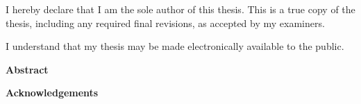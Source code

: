 \noindent
I hereby declare that I am the sole author of this thesis. This is a true copy of the thesis, including any required final revisions, as accepted by my examiners.

\bigskip

\noindent
I understand that my thesis may be made electronically available to the public.

\cleardoublepage


\begin{center}\textbf{Abstract}\end{center}



\cleardoublepage


\begin{center}\textbf{Acknowledgements}\end{center}



\cleardoublepage

\renewcommand\contentsname{Table of Contents}
\tableofcontents
\cleardoublepage
{}    %

\listoftables
\cleardoublepage
{}		%

\listoffigures
\cleardoublepage
{}		%


